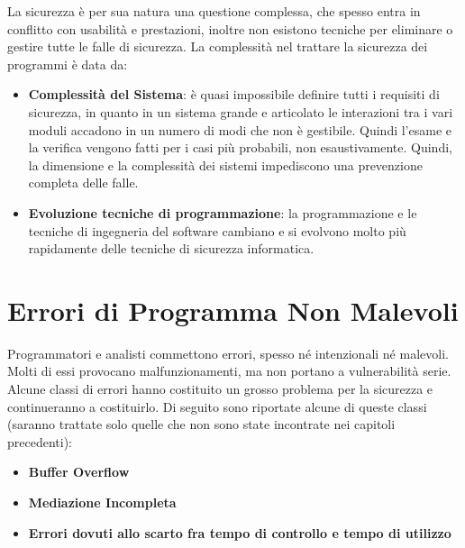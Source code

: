 La sicurezza è per sua natura una questione complessa, che spesso entra in conflitto con usabilità e prestazioni, inoltre non esistono tecniche per eliminare o gestire tutte le falle di sicurezza.
La complessità nel trattare la sicurezza dei programmi è data da:

\begin{itemize}
\item \textbf{Complessità del Sistema}: è quasi impossibile definire tutti i requisiti di sicurezza, in quanto in un sistema grande e articolato le interazioni tra i vari moduli accadono in un numero di modi che non è gestibile. Quindi l'esame e la verifica vengono fatti per i casi più probabili, non esaustivamente. Quindi, la dimensione e la complessità dei sistemi impediscono una prevenzione completa delle falle.
\item \textbf{Evoluzione tecniche di programmazione}: la programmazione e le tecniche di ingegneria del software cambiano e si evolvono molto più rapidamente delle tecniche di sicurezza informatica.
\end{itemize}

\section{Errori di Programma Non Malevoli}
Programmatori e analisti commettono errori, spesso né intenzionali né malevoli. Molti di essi provocano malfunzionamenti, ma non portano a vulnerabilità serie. Alcune classi di errori hanno costituito un grosso problema per la sicurezza e continueranno a costituirlo. Di seguito sono riportate alcune di queste classi (saranno trattate solo quelle che non sono state incontrate nei capitoli precedenti):

\begin{itemize}
\item \textbf{Buffer Overflow}
\item \textbf{Mediazione Incompleta}
\item \textbf{Errori dovuti allo scarto fra tempo di controllo e tempo di utilizzo}
\end{itemize}

